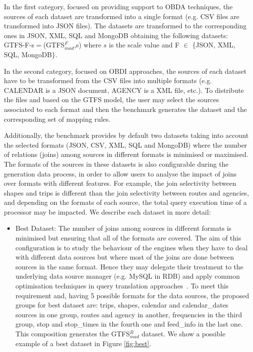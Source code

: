 \begin{enumerate}[label=\textbf{\arabic*})]
    In the first category, focused on providing support to OBDA techniques, the sources of each dataset are transformed into a single format (e.g. CSV files are transformed into JSON files). The datasets are transformed to the corresponding ones in JSON, XML, SQL and MongoDB obtaining the following datasets: GTFS-F-s$=$(GTFS$_{mad}^{F}$,s) where $s$ is the scale value and F $\in$ $\{$JSON, XML, SQL, MongoDB$\}$. 
    
    In the second category, focused on OBDI approaches, the sources of each dataset have to be transformed from the CSV files into multiple formats (e.g. CALENDAR is a JSON document, AGENCY is a XML file, etc.). To distribute the files and based on the GTFS model, the user may select the sources associated to each format and then the benchmark generates the dataset and the corresponding set of mapping rules. 
    
    Additionally, the benchmark provides by default two datasets taking into account the selected formats (JSON, CSV, XML, SQL and MongoDB) where the number of relations (joins) among sources in different formats is minimised or maximised. The formats of the sources in these datasets is also configurable during the generation data process, in order to allow users to analyse the impact of joins over formats with different features. For example, the join selectivity between shapes and trips is different than the join selectivity between routes and agencies, and depending on the formats of each source, the total query execution time of a processor may be impacted. We describe each dataset in more detail:
    \begin{itemize}
        \item Best Dataset: The number of joins among sources in different formats is minimised but ensuring that %
        all of the formats are covered. The aim of this configuration is to study the behaviour of the engines when they have to deal with different data sources but where most of the joins are done between sources in the same format. Hence they may delegate their treatment to the underlying data source manager (e.g. MySQL in RDB) and apply common optimisation techniques in query translation approaches~\citep{priyatna2014formalisation}. To meet this requirement and, having 5 possible formats for the data sources, the proposed groups for best dataset are: trips, shapes, calendar and calendar\_dates sources in one group, routes and agency in another, frequencies in the third group, stop and stop\_times in the fourth one and feed\_info in the last one. This composition generates the GTFS$_{mad}^{B}$ dataset. We show a possible example of a best dataset in Figure \ref{fig:best}. 
       

\end{itemize}
\end{enumerate}
